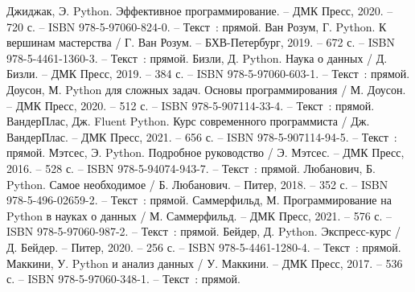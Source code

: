 
\begin{thebibliography}{9}

    Джиджак, Э. Python. Эффективное программирование. – ДМК Пресс, 2020. – 720 с. – ISBN 978-5-97060-824-0. – Текст~: прямой.
    Ван Розум, Г. Python. К вершинам мастерства / Г. Ван Розум. – БХВ-Петербург, 2019. – 672 с. – ISBN 978-5-4461-1360-3. – Текст~: прямой.
    Бизли, Д. Python. Наука о данных / Д. Бизли. – ДМК Пресс, 2019. – 384 с. – ISBN 978-5-97060-603-1. – Текст~: прямой.
    Доусон, М. Python для сложных задач. Основы программирования / М. Доусон. – ДМК Пресс, 2020. – 512 с. – ISBN 978-5-907114-33-4. – Текст~: прямой.
    ВандерПлас, Дж. Fluent Python. Курс современного программиста / Дж. ВандерПлас. – ДМК Пресс, 2021. – 656 с. – ISBN 978-5-907114-94-5. – Текст~: прямой.
    Мэтсес, Э. Python. Подробное руководство / Э. Мэтсес. – ДМК Пресс, 2016. – 528 с. – ISBN 978-5-94074-943-7. – Текст~: прямой.
    Любанович, Б. Python. Самое необходимое / Б. Любанович. – Питер, 2018. – 352 с. – ISBN 978-5-496-02659-2. – Текст~: прямой.
    Саммерфильд, М. Программирование на Python в науках о данных / М. Саммерфильд. – ДМК Пресс, 2021. – 576 с. – ISBN 978-5-97060-987-2. – Текст~: прямой.
    Бейдер, Д. Python. Экспресс-курс / Д. Бейдер. – Питер, 2020. – 256 с. – ISBN 978-5-4461-1280-4. – Текст~: прямой.
    Маккини, У. Python и анализ данных / У. Маккини. – ДМК Пресс, 2017. – 536 с. – ISBN 978-5-97060-348-1. – Текст~: прямой.
    
\end{thebibliography}
